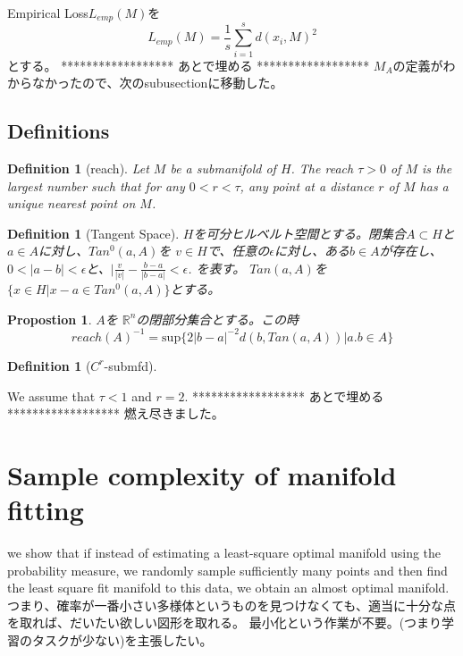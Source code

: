 \documentclass{ujarticle}
\newtheorem{dfn}[thm]{Definition}
\newtheorem{prop}[thm]{Propostion}
\begin{document}
Empirical Loss$L_{emp}(M)$を
\begin{equation*}
 L_{emp}(M)= \frac{1}{s}\sum_{i=1}^s d(x_i,M)^2
\end{equation*}
とする。
******************
 あとで埋める
******************
$M_A$の定義がわからなかったので、次のsubusectionに移動した。

\subsection{Definitions}
\label{sub-Definitions}
\begin{dfn}[reach]
  Let $M$ be a submanifold of $H$. The reach $ \tau > 0$ of $M$ is the largest number such that
  for any $0 < r < \tau$, any point at a distance $r$ of $M$ has a unique nearest point on $M$.
\end{dfn}

\begin{dfn}[Tangent Space]
$H$を可分ヒルベルト空間とする。閉集合$A \subset H$と$a \in A$に対し、$Tan^0(a,A)$を
$v \in H$で、任意の$\epsilon$に対し、ある$b \in A$が存在し、$0 <|a -b| < \epsilon$と、$|\frac{v}{|v|} - \frac{b-a}{|b-a|} < \epsilon$.
を表す。
$Tan(a,A)$を$\{x \in H| x -a \in Tan^0(a,A)\}$とする。
\end{dfn}
\begin{prop} $A$を $\mathbb{R}^n$の閉部分集合とする。この時
  \begin{equation*}
   reach(A)^{-1}=\mathrm{sup}\{2|b-a|^{-2}d(b,Tan(a,A)) | a.b \in A\}
  \end{equation*}
\end{prop}
\begin{dfn}[$C^r$-submfd]

\end{dfn}
We assume that $\tau < 1$ and $r = 2$.
******************
 あとで埋める
******************
燃え尽きました。


\section{Sample complexity of manifold fitting}
\label{Sample complexity of manifold fitting}

we show that if instead of estimating a least-square optimal manifold using the probability
measure, we randomly sample sufficiently many points and then find the least square fit manifold to this
data, we obtain an almost optimal manifold.
つまり、確率が一番小さい多様体というものを見つけなくても、適当に十分な点を取れば、だいたい欲しい図形を取れる。
最小化という作業が不要。(つまり学習のタスクが少ない)を主張したい。
\end{document}
